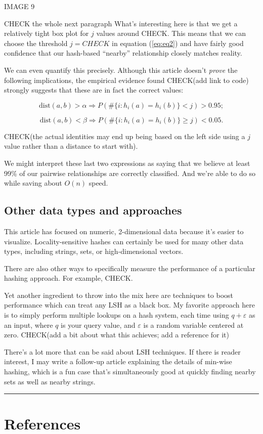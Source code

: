 \documentclass[20pt,]{extarticle}
\begin{document}
IMAGE 9

CHECK the whole next paragraph What's interesting here is that we get a
relatively tight box plot for \(j\) values around CHECK. This means that
we can choose the threshold \(j=CHECK\) in equation (\ref{eq:eq2}) and
have fairly good confidence that our hash-based ``nearby'' relationship
closely matches reality.

We can even quantify this precisely. Although this article doesn't
\emph{prove} the following implications, the empirical evidence found
CHECK(add link to code) strongly suggests that these are in fact the
correct values:

\[ \text{dist}(a, b) > \alpha \Rightarrow P(\#\{i : h_i(a) = h_i(b)\} < j) > 0.95; \]

\[ \text{dist}(a, b) < \beta  \Rightarrow P(\#\{i : h_i(a) = h_i(b)\} \ge j) < 0.05. \]

CHECK(the actual identities may end up being based on the left side
using a \(j\) value rather than a distance to start with).

We might interpret these last two expressions as saying that we believe
at least 99\% of our pairwise relationships are correctly classified.
And we're able to do so while saving about \(O(n)\) speed.

\subsection{Other data types and
approaches}\label{other-data-types-and-approaches}

This article has focused on numeric, 2-dimensional data because it's
easier to visualize. Locality-sensitive hashes can certainly be used for
many other data types, including strings, sets, or high-dimensional
vectors.

There are also other ways to specifically measure the performance of a
particular hashing approach. For example, CHECK.

Yet another ingredient to throw into the mix here are techniques to
boost performance which can treat any LSH as a black box. My favorite
approach here is to simply perform multiple lookups on a hash system,
each time using \(q + \varepsilon\) as an input, where \(q\) is your
query value, and \(\varepsilon\) is a random variable centered at zero.
CHECK(add a bit about what this achieves; add a reference for it)

There's a lot more that can be said about LSH techniques. If there is
reader interest, I may write a follow-up article explaining the details
of min-wise hashing, which is a fun case that's simultaneously good at
quickly finding nearby sets as well as nearby strings.

\begin{center}\rule{0.5\linewidth}{\linethickness}\end{center}

\section{References}\label{references}
\end{document}
